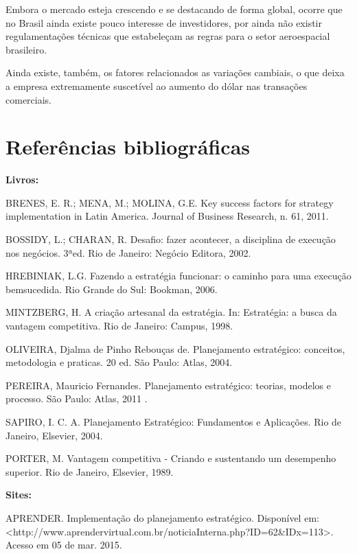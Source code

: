 \documentclass[
	12pt,				%
	openright,			%
	oneside,			%
	a4paper,			%
	english,			%
	french,				%
	spanish,			%
	brazil				%
	]{abntex2}
\begin{document}
	Embora o mercado esteja crescendo e se destacando de forma global, ocorre que no Brasil ainda existe pouco interesse de investidores, por ainda não existir regulamentações técnicas que estabeleçam as regras para o setor aeroespacial brasileiro.
	
	Ainda existe, também, os fatores relacionados as variações cambiais, o que deixa a empresa extremamente suscetível ao aumento do dólar nas transações comerciais.
	
\chapter[Referências bibliográficas]{Referências bibliográficas}



\textbf{Livros:}
	
BRENES, E. R.; MENA, M.; MOLINA, G.E. Key success factors for strategy implementation in Latin America. Journal of Business Research, n. 61, 2011.

BOSSIDY, L.; CHARAN, R. Desafio: fazer acontecer, a disciplina de execução nos negócios. 3ªed. Rio de Janeiro: Negócio Editora, 2002.

HREBINIAK, L.G. Fazendo a estratégia funcionar: o caminho para uma execução bemsucedida. Rio Grande do Sul: Bookman, 2006.

MINTZBERG, H. A criação artesanal da estratégia. In:  Estratégia: a busca da vantagem competitiva. Rio de Janeiro: Campus, 1998. 

OLIVEIRA, Djalma de Pinho Rebouças de. Planejamento estratégico: conceitos, metodologia e praticas. 20 ed. São Paulo: Atlas, 2004.

PEREIRA, Mauricio Fernandes. Planejamento estratégico: teorias, modelos e processo. São Paulo: Atlas, 2011	.
 
SAPIRO, I. C. A. Planejamento Estratégico: Fundamentos e Aplicações. Rio de Janeiro, Elsevier, 2004.

PORTER, M. Vantagem competitiva - Criando e sustentando um desempenho superior. Rio de Janeiro, Elsevier, 1989.

	\textbf{Sites:}
	
	APRENDER. Implementação do planejamento estratégico. Disponível em: \linebreak <http://www.aprendervirtual.com.br/noticiaInterna.php?ID=62\&IDx=113>. Acesso em 05 de mar. 2015.
	
\end{document}
